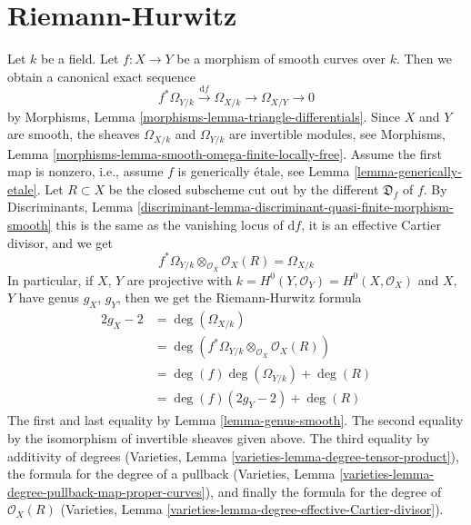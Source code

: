 \section{Riemann-Hurwitz}
\label{section-riemann-hurewitz}

\noindent
Let $k$ be a field. Let $f : X \to Y$ be a morphism of smooth curves over $k$.
Then we obtain a canonical exact sequence
$$
f^*\Omega_{Y/k} \xrightarrow{\text{d}f} \Omega_{X/k}
\longrightarrow \Omega_{X/Y} \longrightarrow 0
$$
by Morphisms, Lemma \ref{morphisms-lemma-triangle-differentials}.
Since $X$ and $Y$ are smooth, the sheaves $\Omega_{X/k}$ and
$\Omega_{Y/k}$ are invertible modules, see
Morphisms, Lemma \ref{morphisms-lemma-smooth-omega-finite-locally-free}.
Assume the first map is nonzero, i.e., assume $f$ is generically
\'etale, see Lemma \ref{lemma-generically-etale}. Let $R \subset X$
be the closed subscheme cut out by the different $\mathfrak{D}_f$ of $f$.
By Discriminants, Lemma
\ref{discriminant-lemma-discriminant-quasi-finite-morphism-smooth}
this is the same as the vanishing locus of $\text{d}f$, it is
an effective Cartier divisor, and we get
$$
f^*\Omega_{Y/k} \otimes_{\mathcal{O}_X} \mathcal{O}_X(R) = \Omega_{X/k}
$$
In particular, if $X$, $Y$ are projective with
$k = H^0(Y, \mathcal{O}_Y) = H^0(X, \mathcal{O}_X)$
and $X$, $Y$ have genus $g_X$, $g_Y$, then we get the
Riemann-Hurwitz formula
\begin{align*}
2g_X - 2 & =
\deg(\Omega_{X/k}) \\
& =
\deg(f^*\Omega_{Y/k} \otimes_{\mathcal{O}_X} \mathcal{O}_X(R)) \\
& =
\deg(f) \deg(\Omega_{Y/k}) + \deg(R) \\
& =
\deg(f) (2g_Y - 2) + \deg(R)
\end{align*}
The first and last equality by Lemma \ref{lemma-genus-smooth}.
The second equality by the isomorphism of invertible sheaves given above.
The third equality by additivity of degrees
(Varieties, Lemma \ref{varieties-lemma-degree-tensor-product}),
the formula for the degree of a pullback
(Varieties, Lemma \ref{varieties-lemma-degree-pullback-map-proper-curves}),
and finally the formula for the degree of $\mathcal{O}_X(R)$
(Varieties, Lemma \ref{varieties-lemma-degree-effective-Cartier-divisor}).

